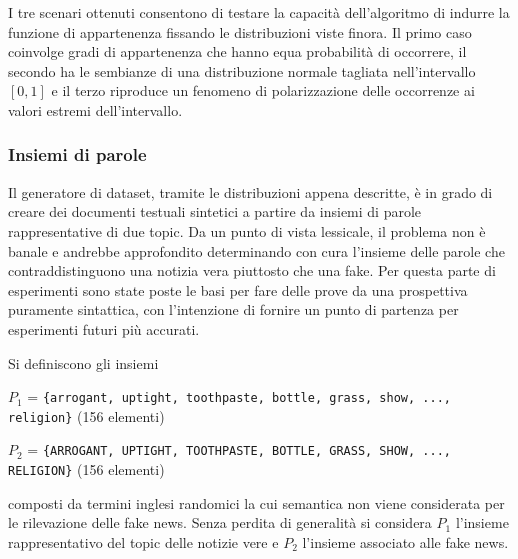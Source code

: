\documentclass[12pt]{report}
\theoremstyle{definition}
\begin{document}
I tre scenari ottenuti consentono di testare la capacità dell'algoritmo di indurre la funzione di appartenenza fissando le distribuzioni viste finora. Il primo caso coinvolge gradi di appartenenza che hanno equa probabilità di occorrere, il secondo ha le sembianze di una distribuzione normale tagliata nell'intervallo $[0,1]$ e il terzo riproduce un fenomeno di polarizzazione delle occorrenze ai valori estremi dell'intervallo.

\subsubsection{Insiemi di parole} Il generatore di dataset, tramite le distribuzioni appena descritte, è in grado di creare dei documenti testuali sintetici a partire da insiemi di parole rappresentative di due topic.
Da un punto di vista lessicale, il problema non è banale e andrebbe approfondito determinando con cura l'insieme delle parole che contraddistinguono una notizia vera piuttosto che una fake.
Per questa parte di esperimenti sono state poste le basi per fare delle prove da una prospettiva puramente sintattica, con l'intenzione di fornire un punto di partenza per esperimenti futuri più accurati.

Si definiscono gli insiemi
\begin{center}
    $P_1$ = \texttt{\{arrogant, uptight, toothpaste, bottle, grass, show, ..., religion\}} (156 elementi)
\end{center}
\begin{center}
    $P_2$ = \texttt{\{ARROGANT, UPTIGHT, TOOTHPASTE, BOTTLE, GRASS, SHOW, ..., RELIGION\}} (156 elementi)
\end{center}
composti da termini inglesi randomici la cui semantica non viene considerata per le rilevazione delle fake news. Senza perdita di generalità si considera $P_1$ l'insieme rappresentativo del topic delle notizie vere e $P_2$ l'insieme associato alle fake news.
\end{document}
